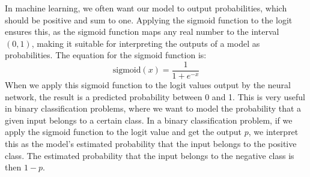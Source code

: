 In machine learning, we often want our model to output probabilities, which should be positive and sum to one. Applying the sigmoid function to the logit ensures this, as the sigmoid function maps any real number to the interval \((0,1)\), making it suitable for interpreting the outputs of a model as probabilities.
The equation for the sigmoid function is:
\begin{equation}
\text{{sigmoid}}(x) = \frac{1}{1 + e^{-x}}
\end{equation}
When we apply this sigmoid function to the logit values output by the neural network, the result is a predicted probability between 0 and 1. This is very useful in binary classification problems, where we want to model the probability that a given input belongs to a certain class.
In a binary classification problem, if we apply the sigmoid function to the logit value and get the output \( p \), we interpret this as the model's estimated probability that the input belongs to the positive class. The estimated probability that the input belongs to the negative class is then \( 1 - p \).
%
